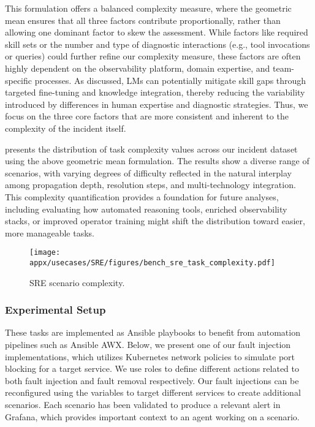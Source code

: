 This formulation offers a balanced complexity measure, where the geometric mean ensures that all three factors contribute proportionally, rather than allowing one dominant factor to skew the assessment. 
While factors like required skill sets or the number and type of diagnostic interactions (e.g., tool invocations or queries) could further refine our complexity measure, these factors are often highly dependent on the observability platform, domain expertise, and team-specific processes. 
As discussed, LMs can potentially mitigate skill gaps through targeted fine-tuning and knowledge integration, thereby reducing the variability introduced by differences in human expertise and diagnostic strategies. 
Thus, we focus on the three core factors that are more consistent and inherent to the complexity of the incident itself.

 presents the distribution of task complexity values across our incident dataset using the above geometric mean formulation. 
The results show a diverse range of scenarios, with varying degrees of difficulty reflected in the natural interplay among propagation depth, resolution steps, and multi-technology integration. 
This complexity quantification provides a foundation for future analyses, including evaluating how automated reasoning tools, enriched observability stacks, or improved operator training might shift the distribution toward easier, more manageable tasks.

\begin{figure}[t!]
    \centering
    \texttt{[image: appx/usecases/SRE/figures/bench\_sre\_task\_complexity.pdf]}
    \caption{SRE scenario complexity.} 
    \label{fig:ss-bench-sre-task-complexity}
\end{figure}

\subsubsection{Experimental Setup}
\label{appx:sre:exp_setup}
These tasks are implemented as Ansible playbooks to benefit from automation pipelines such as Ansible AWX. Below, we present one of our fault injection implementations, which utilizes Kubernetes network policies to simulate port blocking for a target service. We use roles to define different actions related to both fault injection and fault removal respectively. Our fault injections can be reconfigured using the variables to target different services to create additional scenarios. Each scenario has been validated to produce a relevant alert in Grafana, which provides important context to an agent working on a scenario.

